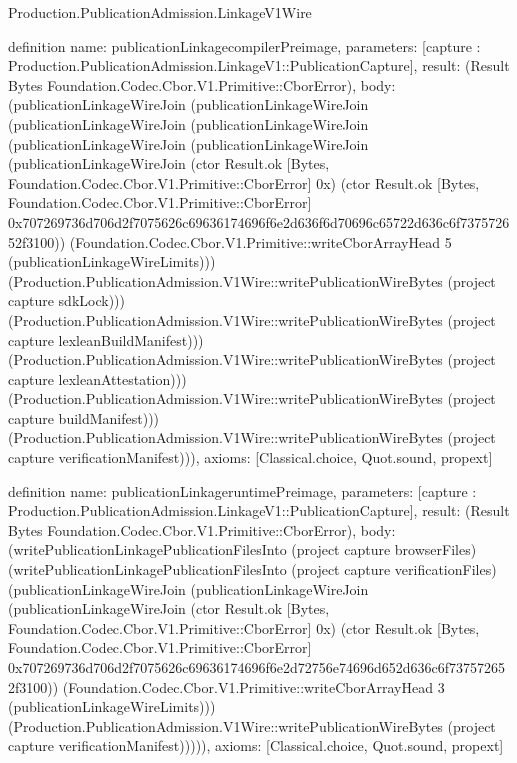 \begin{lexlean}{Production.PublicationAdmission.LinkageV1Wire}
\begin{semanticmodule}
definition{
  name: publicationLinkagecompilerPreimage,
  parameters: [capture : Production.PublicationAdmission.LinkageV1::PublicationCapture],
  result: (Result Bytes Foundation.Codec.Cbor.V1.Primitive::CborError),
  body: (publicationLinkageWireJoin (publicationLinkageWireJoin (publicationLinkageWireJoin (publicationLinkageWireJoin (publicationLinkageWireJoin (publicationLinkageWireJoin (publicationLinkageWireJoin (ctor Result.ok [Bytes, Foundation.Codec.Cbor.V1.Primitive::CborError] 0x) (ctor Result.ok [Bytes, Foundation.Codec.Cbor.V1.Primitive::CborError] 0x707269736d706d2f7075626c69636174696f6e2d636f6d70696c65722d636c6f737572652f3100)) (Foundation.Codec.Cbor.V1.Primitive::writeCborArrayHead 5 (publicationLinkageWireLimits))) (Production.PublicationAdmission.V1Wire::writePublicationWireBytes (project capture sdkLock))) (Production.PublicationAdmission.V1Wire::writePublicationWireBytes (project capture lexleanBuildManifest))) (Production.PublicationAdmission.V1Wire::writePublicationWireBytes (project capture lexleanAttestation))) (Production.PublicationAdmission.V1Wire::writePublicationWireBytes (project capture buildManifest))) (Production.PublicationAdmission.V1Wire::writePublicationWireBytes (project capture verificationManifest))),
  axioms: [Classical.choice, Quot.sound, propext]
}

definition{
  name: publicationLinkageruntimePreimage,
  parameters: [capture : Production.PublicationAdmission.LinkageV1::PublicationCapture],
  result: (Result Bytes Foundation.Codec.Cbor.V1.Primitive::CborError),
  body: (writePublicationLinkagePublicationFilesInto (project capture browserFiles) (writePublicationLinkagePublicationFilesInto (project capture verificationFiles) (publicationLinkageWireJoin (publicationLinkageWireJoin (publicationLinkageWireJoin (ctor Result.ok [Bytes, Foundation.Codec.Cbor.V1.Primitive::CborError] 0x) (ctor Result.ok [Bytes, Foundation.Codec.Cbor.V1.Primitive::CborError] 0x707269736d706d2f7075626c69636174696f6e2d72756e74696d652d636c6f737572652f3100)) (Foundation.Codec.Cbor.V1.Primitive::writeCborArrayHead 3 (publicationLinkageWireLimits))) (Production.PublicationAdmission.V1Wire::writePublicationWireBytes (project capture verificationManifest))))),
  axioms: [Classical.choice, Quot.sound, propext]
}


\end{semanticmodule}
\end{lexlean}
